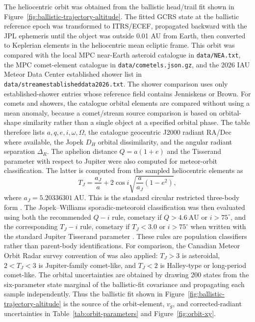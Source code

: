 The heliocentric orbit was obtained from the ballistic head/trail fit shown in
Figure~\ref{fig:ballistic-trajectory-altitude}.  The fitted GCRS state at the
ballistic reference epoch was transformed to ITRS/ECEF, propagated backward
with the JPL ephemeris until the object was outside 0.01 AU from Earth, then
converted to Keplerian elements in the heliocentric mean ecliptic frame.  This
orbit was compared with the
local MPC near-Earth asteroid catalogue in \texttt{data/NEA.txt}, the MPC
comet-element catalogue in \texttt{data/cometels.json.gz}, and the 2026 IAU Meteor
Data Center established shower list in
\texttt{data/streamestablisheddata2026.txt}.  The shower comparison uses only
established-shower entries whose reference field contains Jenniskens or Brown.
For comets and showers, the catalogue orbital elements are compared without
using a mean anomaly, because a comet/stream source comparison is based on
orbital-shape similarity rather than a single object at a specified orbital
phase.  The table therefore lists \(a,q,e,i,\omega,\Omega\), the catalogue
geocentric J2000 radiant RA/Dec where available, the Jopek \(D_H\) orbital
dissimilarity, and the angular radiant separation \(\Delta_R\).
The aphelion distance \(Q=a(1+e)\) and the Tisserand parameter with respect to
Jupiter were also computed for meteor-orbit classification.  The latter is
computed from the sampled heliocentric elements as
\[
  T_J = \frac{a_J}{a}
        + 2\cos i \sqrt{\frac{a}{a_J}\left(1-e^2\right)},
\]
where \(a_J=5.20336301~\mathrm{AU}\).  This is the standard circular
restricted three-body form \cite{murray_dermott_1999}.  The
Jopek--Williams sporadic-meteoroid classification was then evaluated using
both the recommended \(Q-i\) rule, cometary if \(Q>4.6~\mathrm{AU}\) or
\(i>75^\circ\), and the corresponding \(T_J-i\) rule, cometary if
\(T_J<3.0\) or \(i>75^\circ\) when written with the standard Jupiter
Tisserand parameter \cite{jopek_williams_2013}.  These rules are population
classifiers rather than parent-body identifications.  For comparison, the
Canadian Meteor Orbit Radar survey convention of \textcite{brown_2008_cmor}
was also applied: \(T_J>3\) is asteroidal, \(2<T_J<3\) is Jupiter-family
comet-like, and \(T_J<2\) is Halley-type or long-period comet-like.
The orbital uncertainties are obtained by drawing 200 states from the
six-parameter state marginal of the ballistic-fit covariance and propagating
each sample independently.  Thus the ballistic fit shown in
Figure~\ref{fig:ballistic-trajectory-altitude} is the source of the
orbit-element, \(v_g\), and corrected-radiant uncertainties in
Table~\ref{tab:orbit-parameters} and Figure~\ref{fig:orbit-xy}.

